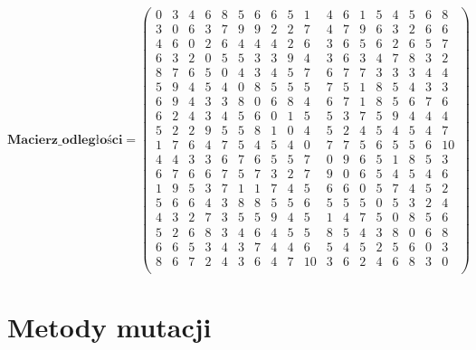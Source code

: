 \par
$$
\mathbf{Macierz\_odległości} =
\left( \begin{array}{cccccccccccccccccc}
   0& 3& 4& 6& 8& 5& 6& 6& 5& 1& 4& 6& 1& 5& 4& 5& 6& 8\\
    3& 0& 6& 3& 7& 9& 9& 2& 2& 7& 4& 7& 9& 6& 3& 2& 6& 6\\
    4& 6& 0& 2& 6& 4& 4& 4& 2& 6& 3& 6& 5& 6& 2& 6& 5& 7\\
    6& 3& 2& 0& 5& 5& 3& 3& 9& 4& 3& 6& 3& 4& 7& 8& 3& 2\\
    8& 7& 6& 5& 0& 4& 3& 4& 5& 7& 6& 7& 7& 3& 3& 3& 4& 4\\
    5& 9& 4& 5& 4& 0& 8& 5& 5& 5& 7& 5& 1& 8& 5& 4& 3& 3\\
    6& 9& 4& 3& 3& 8& 0& 6& 8& 4& 6& 7& 1& 8& 5& 6& 7& 6\\
    6& 2& 4& 3& 4& 5& 6& 0& 1& 5& 5& 3& 7& 5& 9& 4& 4& 4\\
    5& 2& 2& 9& 5& 5& 8& 1& 0& 4& 5& 2& 4& 5& 4& 5& 4& 7\\
    1& 7& 6& 4& 7& 5& 4& 5& 4& 0& 7& 7& 5& 6& 5& 5& 6& 10\\
    4& 4& 3& 3& 6& 7& 6& 5& 5& 7& 0& 9& 6& 5& 1& 8& 5& 3\\
    6& 7& 6& 6& 7& 5& 7& 3& 2& 7& 9& 0& 6& 5& 4& 5& 4& 6\\
    1& 9& 5& 3& 7& 1& 1& 7& 4& 5& 6& 6& 0& 5& 7& 4& 5& 2\\
    5& 6& 6& 4& 3& 8& 8& 5& 5& 6& 5& 5& 5& 0& 5& 3& 2& 4\\
    4& 3& 2& 7& 3& 5& 5& 9& 4& 5& 1& 4& 7& 5& 0& 8& 5& 6\\
    5& 2& 6& 8& 3& 4& 6& 4& 5& 5& 8& 5& 4& 3& 8& 0& 6& 8\\
    6& 6& 5& 3& 4& 3& 7& 4& 4& 6& 5& 4& 5& 2& 5& 6& 0& 3\\
    8& 6& 7& 2& 4& 3& 6& 4& 7& 10& 3& 6& 2& 4& 6& 8& 3& 0\\
\end{array} \right)
$$

\par

\section{Metody mutacji}\label{sec:strukturaDokumentu}

